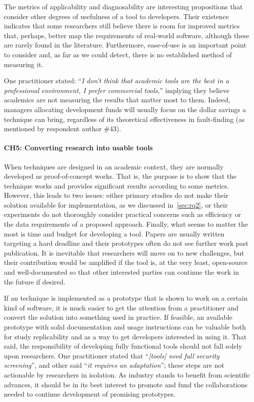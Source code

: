 The metrics of applicability and diagnosability  are interesting propositions that consider other degrees of usefulness of a tool to developers.
Their existence indicates that some researchers still believe there is room for improved metrics that, perhaps, better map the requirements of real-world software, although these are rarely found in the literature.
Furthermore, ease-of-use is an important point to consider and, as far as we could detect, there is no established method of measuring it.

One practitioner stated: ``\textit{I don't think that academic tools are the best in a professional environment, I prefer commercial tools,}'' implying they believe academics are not measuring the results that matter most to them.
Indeed, managers allocating development funds will usually focus on the dollar savings a technique can bring, regardless of its theoretical effectiveness in fault-finding (as mentioned by respondent author \#43).

\paragraph{CH5: Converting research into usable tools}
When techniques are designed in an academic context, they are normally developed as proof-of-concept works.
That is, the purpose is to show that the technique works and provides significant results according to some metrics.
However, this leads to two issues: either primary studies do not make their solution available for implementation, as we discussed in~\autoref{sec:rq2}, or their experiments do not thoroughly consider practical concerns such as efficiency or the data requirements of a proposed approach.
Finally, what seems to matter the most is time and budget for developing a tool.
Papers are usually written targeting a hard deadline and their prototypes often do not see further work past publication.
It is inevitable that researchers will move on to new challenges, but their contribution would be amplified if the tool is, at the very least, open-source and well-documented so that other interested parties can continue the work in the future if desired.

If an \rt technique is implemented as a prototype that is shown to work on a certain kind of software, it is much easier to get the attention from a practitioner and convert the solution into something used in practice.
If feasible, an available prototype with solid documentation and usage instructions can be valuable both for study replicability and as a way to get developers interested in using it. 
That said, the responsibility of developing fully functional tools should not fall solely upon researchers.
One practitioner stated that ``\textit{[\rt tools] need full security screening}'', and other said ``\textit{it requires an adaptation}''; these steps are not actionable by researchers in isolation.
As industry stands to benefit from scientific advances, it should be in its best interest to promote and fund the collaborations needed to continue development of promising prototypes.

